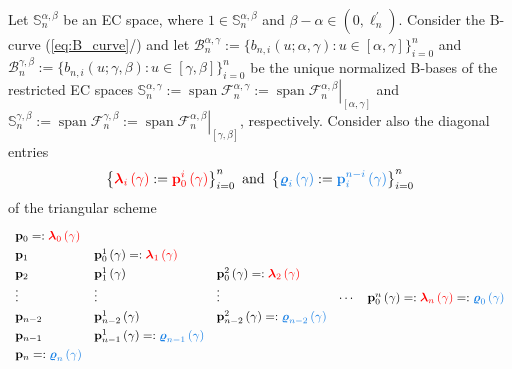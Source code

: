 \documentclass[b5paper, twosided]{book}
\newcommand{\Red}[1]{{\color[rgb]{1.0, 0.0, 0.0}{#1}}}
\newcommand{\Blue}[1]{{\color[rgb]{0.1, 0.5, 0.9}{#1}}}
\DeclareRobustCommand{\mref}[1]{\ref{#1}{\relsize{-1}/\pageref{#1}}}
\begin{document}
Let $\mathbb{S}_n^{\alpha,\beta}$ be an EC space, where $1\in\mathbb{S}_n^{\alpha,\beta}$ and $\beta-\alpha \in \left(0,\ell_n^{\prime}\right)$. Consider the B-curve (\mref{eq:B_curve}) and let $
\mathcal{B}_{n}^{\alpha,\gamma}:=\{  b_{n,i}\left(  u;\alpha
,\gamma\right)  :\allowbreak{}u\allowbreak{}\in\allowbreak{}\left[  \alpha,\gamma\right]  \}  _{i=0}^{n}%
$
and $\mathcal{B}_{n}^{\gamma,\beta}:=\{  b_{n,i}\left(  u;\gamma,\beta\right)
:u \in\allowbreak{}[  \gamma,\beta]  \}  _{i=0}^{n}$ be the unique normalized B-bases of the restricted EC spaces $\mathbb{S}_n^{\alpha,\gamma}:=\operatorname{span}\mathcal{F}_{n}^{\alpha,\gamma}\allowbreak{}:=\operatorname{span}\allowbreak{}\left.  \mathcal{F}_{n}^{\alpha,\beta
}\right\vert _{\left[  \alpha,\gamma\right]  }%
$ and $
\mathbb{S}_n^{\gamma,\beta}:=\operatorname{span}\mathcal{F}_{n}^{\gamma,\beta}:=\operatorname{span}\left.  \mathcal{F}_{n}^{\alpha,\beta
}\right\vert _{\left[  \gamma,\beta\right]  }
$, respectively. Consider also the diagonal entries
$$
\left\{\Red{\boldsymbol{\lambda}_i\left(\gamma\right)}:=\Red{\mathbf{p}_0^i\left(\gamma\right)}\right\}_{i=0}^n
\text{ and }
\left\{\Blue{\boldsymbol{\varrho}_i\left(\gamma\right)}:=\Blue{\mathbf{p}_{i}^{n-i}\left(\gamma\right)}\right\}_{i=0}^n
$$
of the triangular scheme 
\[%
\def\arraystretch{1.3}
\begin{array}
[c]{lllll}%
\mathbf{p}_{0}=:%
\Red{\boldsymbol{\lambda}_{0}\left(\gamma\right)} &  &  &  & \\
\mathbf{p}_{1} & \mathbf{p}_{0}^{1}\left(  \gamma\right)  =:%
\Red{\boldsymbol{\lambda}_{1}\left(\gamma\right)} &  &  & \\
\mathbf{p}_{2} & \mathbf{p}_{1}^{1}\left(  \gamma\right)   & \mathbf{p}%
_{0}^{2}\left(  \gamma\right)  =:%
\Red{\boldsymbol{\lambda}_{2}\left(\gamma\right)} &  & \\
\vdots & \vdots & \vdots & \cdots & \mathbf{p}_{0}^{n}\left(  \gamma\right)  =:%
\Red{\boldsymbol{\lambda}_{n}\left(\gamma\right)}=:\Blue{\boldsymbol{\varrho}_{0}\left(\gamma\right)}\\
\mathbf{p}_{n-2} & \mathbf{p}_{n-2}^{1}\left(  \gamma\right)
& \mathbf{p}_{n-2}^{2}\left(  \gamma\right)  =:\Blue{\boldsymbol{\varrho}_{n-2}\left(\gamma\right)} &  & %
\\
\mathbf{p}_{n-1}
&
\mathbf{p}_{n-1}^{1}\left(  \gamma\right)
=:\Blue{\boldsymbol{\varrho}_{n-1}\left(\gamma\right)}
\\
\mathbf{p}_{n}=:\Blue{\boldsymbol{\varrho}_{n}\left(\gamma\right)}
\end{array}
\def\arraystretch{1.0}
\]
\end{document}
